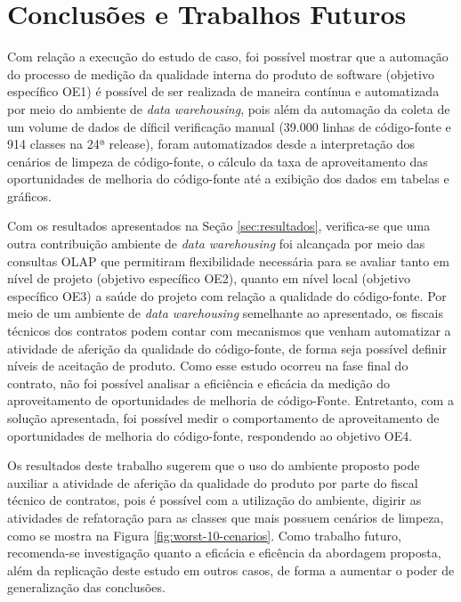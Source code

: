 \section{Conclusões e Trabalhos Futuros}


Com relação a execução do estudo de caso, foi possível mostrar que a automação do processo de medição da qualidade interna do produto de software (objetivo específico OE1)  é possível de ser realizada de maneira contínua e automatizada por meio do ambiente de \textit{data warehousing}, pois além da automação da coleta de um volume de dados de díficil verificação manual (39.000 linhas de código-fonte e 914 classes na 24ª release), foram automatizados desde a interpretação dos cenários de limpeza de código-fonte, o cálculo da taxa de aproveitamento das oportunidades de melhoria do código-fonte até a exibição dos dados em tabelas e gráficos.

Com os resultados apresentados na Seção \ref{sec:resultados}, verifica-se que uma outra contribuição ambiente de \textit{data warehousing} foi alcançada por meio das consultas OLAP que permitiram flexibilidade necessária para se avaliar tanto em nível de projeto (objetivo específico OE2), quanto em nível local (objetivo específico OE3) a saúde do projeto com relação a qualidade do código-fonte. Por meio de um ambiente de \textit{data warehousing} semelhante ao apresentado, os fiscais técnicos dos contratos podem contar com mecanismos que venham automatizar a atividade de aferição da qualidade do código-fonte, de forma seja possível definir níveis de aceitação de produto.
Como esse estudo ocorreu na fase final do contrato, não foi possível analisar a eficiência e eficácia da medição do aproveitamento de oportunidades de melhoria de código-Fonte. Entretanto, com a solução apresentada, foi possível medir o comportamento de aproveitamento de oportunidades de melhoria do código-fonte, respondendo ao objetivo OE4.

Os resultados deste trabalho sugerem que o uso do ambiente proposto pode auxiliar a atividade de aferição da qualidade do produto por parte do fiscal técnico de contratos, pois é possível com a utilização do ambiente, digirir as atividades de refatoração para as classes que mais possuem cenários de limpeza, como se mostra na Figura \ref{fig:worst-10-cenarios}. Como trabalho futuro, recomenda-se investigação quanto a eficácia e eficência da abordagem proposta, além da replicação deste estudo em outros casos, de forma a aumentar o poder de generalização das conclusões.